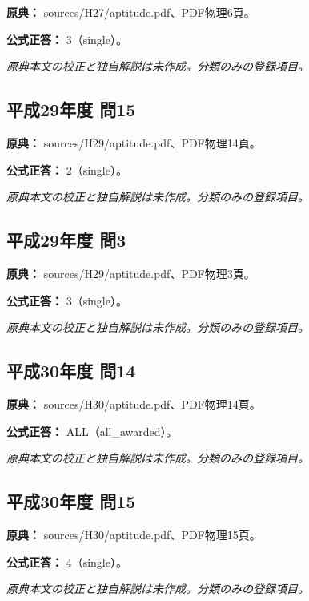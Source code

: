 \noindent\textbf{原典：} sources/H27/aptitude.pdf、PDF物理6頁。

\textbf{公式正答：} 3（single）。

\par\textit{原典本文の校正と独自解説は未作成。分類のみの登録項目。}

\subsection{平成29年度 問15}
\label{q:h29-reg-apt-15}

\noindent\textbf{原典：} sources/H29/aptitude.pdf、PDF物理14頁。

\textbf{公式正答：} 2（single）。

\par\textit{原典本文の校正と独自解説は未作成。分類のみの登録項目。}

\subsection{平成29年度 問3}
\label{q:h29-reg-apt-03}

\noindent\textbf{原典：} sources/H29/aptitude.pdf、PDF物理3頁。

\textbf{公式正答：} 3（single）。

\par\textit{原典本文の校正と独自解説は未作成。分類のみの登録項目。}

\subsection{平成30年度 問14}
\label{q:h30-reg-apt-14}

\noindent\textbf{原典：} sources/H30/aptitude.pdf、PDF物理14頁。

\textbf{公式正答：} ALL（all\_awarded）。

\par\textit{原典本文の校正と独自解説は未作成。分類のみの登録項目。}

\subsection{平成30年度 問15}
\label{q:h30-reg-apt-15}

\noindent\textbf{原典：} sources/H30/aptitude.pdf、PDF物理15頁。

\textbf{公式正答：} 4（single）。

\par\textit{原典本文の校正と独自解説は未作成。分類のみの登録項目。}

